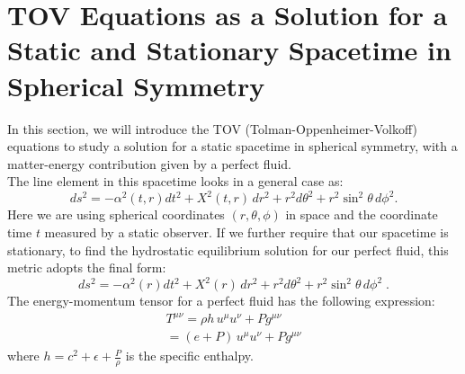 \documentclass[12pt]{report}
\begin{document}
	\chapter{TOV Equations as a Solution for a Static and Stationary Spacetime in Spherical Symmetry}
	In this section, we will introduce the TOV (Tolman-Oppenheimer-Volkoff) equations to study a solution for a static spacetime in spherical symmetry, with a matter-energy contribution given by a perfect fluid.\\
	
	The line element in this spacetime looks in a general case as:
	\begin{equation}
		ds^2 = -\alpha^2(t,r)dt^2+X^2(t,r)\,dr^2+r^2d\theta^2+r^2\sin^2\theta\, d\phi^2.
	\end{equation}
	Here we are using spherical coordinates $(r,\theta,\phi)$ in space and the coordinate time $t$ measured by a static observer.
	If we further require that our spacetime is stationary, to find the hydrostatic equilibrium solution for our perfect fluid, this metric adopts the final form:
	\begin{equation}
		\boxed{ds^2=-\alpha^2(r)dt^2+X^2(r)\,dr^2+r^2d\theta^2+r^2\sin^2\theta\, d\phi^2}\;. \label{eq:metrictov}
	\end{equation}
	The energy-momentum tensor for a perfect fluid has the following expression:
	\begin{align}
		T^{\mu\nu}=\rho h\,u^\mu u^\nu+Pg^{\mu\nu} \\
		=(e+P)\,u^\mu u^\nu+Pg^{\mu\nu}
	\end{align}
	where $h=c^2+\epsilon+\frac{P}{\rho}$ is the specific enthalpy.\\
	
\end{document}
